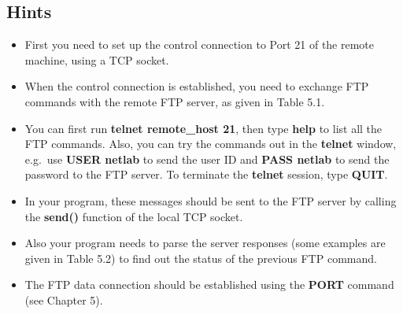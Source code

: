 \documentclass[10pt,a4paper]{article}
\numberwithin{equation}{section}
\numberwithin{figure}{section}
\numberwithin{table}{section}
\begin{document}
    \subsection*{Hints}
    \begin{itemize}
        \item First you need to set up the control connection to Port 21 of the remote machine, using a TCP socket.
        \item When the control connection is established, you need to exchange FTP commands with the remote FTP server, as given in Table 5.1.
        \item You can first run \textbf{telnet remote\_host 21}, then type \textbf{help} to list all the FTP commands.
        Also, you can try the commands out in the \textbf{telnet} window, e.g.\  use \textbf{USER netlab} to send the user ID and \textbf{PASS netlab} to send the password to the FTP server.
        To terminate the \textbf{telnet} session, type \textbf{QUIT}.
        \item In your program, these messages should be sent to the FTP server by calling the \textbf{send()} function of the local TCP socket.
        \item Also your program needs to parse the server responses (some examples are given in Table 5.2) to find out the status of the previous FTP command.
        \item The FTP data connection should be established using the \textbf{PORT} command (see Chapter 5).
    \end{itemize}
\end{document}
